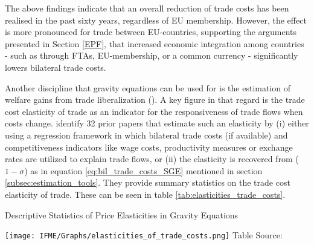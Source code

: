 The above findings indicate that an overall reduction of trade costs has been realised in the past sixty years, regardless of EU membership. However, the effect is more pronounced for trade between EU-countries, supporting the arguments presented in Section \ref{EPF}, that increased economic integration among countries - such as through FTAs, EU-membership, or a common currency - significantly lowers bilateral trade costs. 

































Another discipline that gravity equations can be used for is the estimation of welfare gains from trade liberalization (\cite{old_gains}). A key figure in that regard is the trade cost elasticity of trade as an indicator for the responsiveness of trade flows when costs change. \textcite[p. 163]{cookbook} identify 32 prior papers that estimate such an elasticity by (i) either using a regression framework in which bilateral trade costs (if available) and competitiveness indicators like wage costs, productivity measures or exchange rates are utilized to explain trade flows, or (ii) the elasticity is recovered from ($1-\sigma$) as in equation \ref{eq:bil_trade_costs_SGE} mentioned in section \ref{subsec:estimation_tools}. They provide summary statistics on the trade cost elasticity of trade. These can be seen in table \ref{tab:elasticities_trade_costs}.



\begin{table}[htbp]
    \centering
    \caption[Descriptive Statistics of Price Elasticities in Gravity Equations]{Descriptive Statistics of Price Elasticities in Gravity Equations}
    \texttt{[image: IFME/Graphs/elasticities\_of\_trade\_costs.png]}
    \label{tab:elasticities_trade_costs}
    Table Source: \cite[p. 164]{cookbook}
\end{table}





